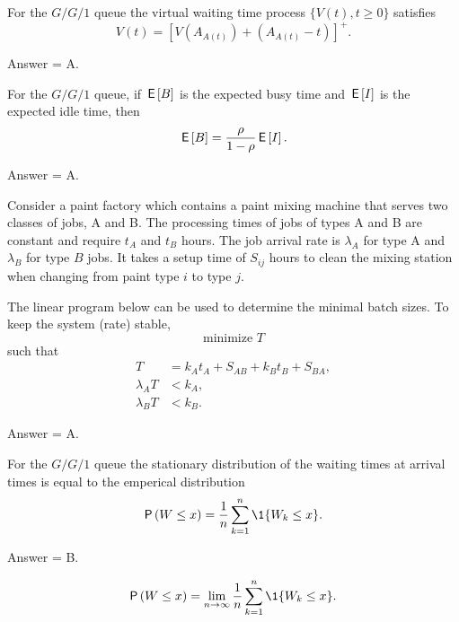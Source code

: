 \begin{exercise}[201704]%
For the $G/G/1$ queue the virtual waiting time process $\{V(t), t\geq 0\}$ 
satisfies
      \begin{equation*}
        V(t) = [V(A_{A(t)}) + (A_{A(t)}-t)]^+.
      \end{equation*}
\begin{solution} Answer = A.
\end{solution}
\end{exercise}

\begin{exercise}[201704]%
  For the $G/G/1$ queue, if $\,\mathsf{E}\left[B\right]$ is the expected busy time and
  $\,\mathsf{E}\left[I\right]$ is the expected idle time, then
\begin{equation*}
  \,\mathsf{E}\left[B\right] = \frac{\rho }{1-\rho} \,\mathsf{E}\left[I\right]. 
\end{equation*}
\begin{solution} Answer = A.
\end{solution}
\end{exercise}

\begin{exercise}[201704]%
  Consider a paint factory which contains a paint mixing machine that
  serves two classes of jobs, A and B. The processing times of jobs of
  types A and B are constant and require $t_A$ and $t_B$ hours. The
  job arrival rate is $\lambda_A$ for type A and $\lambda_B$ for type
  $B$ jobs. It takes a setup time of $S_{i j}$ hours to clean the mixing
  station when changing from paint type $i$ to type $j$.

  The linear program below can be used to determine the minimal batch
  sizes.  To keep the system (rate) stable,
\begin{equation*}
  \text{minimize }  T
\end{equation*}
such that
\begin{align*}
 T&=  k_A t_A + S_{AB} + k_B t_B + S_{BA}, \\
 \lambda_A T &< k_A,  \\
 \lambda_B T &< k_B.
\end{align*}

\begin{solution} Answer = A.
\end{solution}
\end{exercise}

\begin{exercise}[201704]%
  For the $G/G/1$ queue the stationary distribution  of
  the waiting times at arrival times is equal to the emperical distribution
\begin{equation*}
  \P{W \leq x}  =  \frac 1n\sum_{k=1}^n \1{W_k\leq x}.
\end{equation*}
\begin{solution} Answer = B.
  
\begin{equation}
  \P{W \leq x}  = \lim_{n\to\infty} \frac 1n\sum_{k=1}^n \1{W_k\leq x}.
\end{equation}

\end{solution}
\end{exercise}



